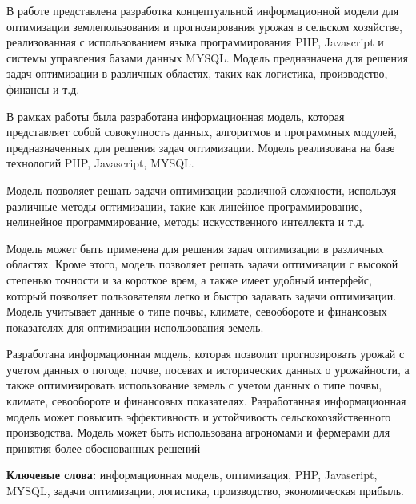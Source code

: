 В работе представлена разработка концептуальной информационной модели
для оптимизации землепользования и прогнозирования урожая в сельском
хозяйстве, реализованная с использованием языка программирования PHP,
Javascript и системы управления базами данных MYSQL. Модель
предназначена для решения задач оптимизации в различных областях, таких
как логистика, производство, финансы и т.д.

В рамках работы была разработана информационная модель, которая
представляет собой совокупность данных, алгоритмов и программных
модулей, предназначенных для решения задач оптимизации. Модель
реализована на базе технологий PHP, Javascript, MYSQL.

Модель позволяет решать задачи оптимизации различной сложности,
используя различные методы оптимизации, такие как линейное
программирование, нелинейное программирование, методы искусственного
интеллекта и т.д.

Модель может быть применена для решения задач оптимизации в различных
областях. Кроме этого, модель позволяет решать задачи оптимизации с
высокой степенью точности и за короткое врем, а также имеет удобный
интерфейс, который позволяет пользователям легко и быстро задавать
задачи оптимизации. Модель учитывает данные о типе почвы, климате,
севообороте и финансовых показателях для оптимизации использования
земель.

Разработана информационная модель, которая позволит прогнозировать
урожай с учетом данных о погоде, почве, посевах и исторических данных о
урожайности, а также оптимизировать использование земель с учетом данных
о типе почвы, климате, севообороте и финансовых показателях.
Разработанная информационная модель может повысить эффективность и
устойчивость сельскохозяйственного производства. Модель может быть
использована агрономами и фермерами для принятия более обоснованных
решений

{\bfseries Ключевые слова:} информационная модель, оптимизация, PHP,
Javascript, MYSQL, задачи оптимизации, логистика, производство,
экономическая прибыль.

